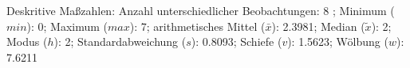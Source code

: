                     \begin{noten}
                	    \note{} Deskritive Maßzahlen:
                	    Anzahl unterschiedlicher Beobachtungen: 8%
                	    ; 
                	      Minimum ($min$): 0; 
                	      Maximum ($max$): 7; 
                	      arithmetisches Mittel ($\bar{x}$): \num[round-mode=places,round-precision=2]{2,3981}; 
                	      Median ($\tilde{x}$): 2; 
                	      Modus ($h$): 2; 
                	      Standardabweichung ($s$): \num[round-mode=places,round-precision=2]{0,8093}; 
                	      Schiefe ($v$): \num[round-mode=places,round-precision=2]{1,5623}; 
                	      Wölbung ($w$): \num[round-mode=places,round-precision=2]{7,6211}
                     \end{noten}


